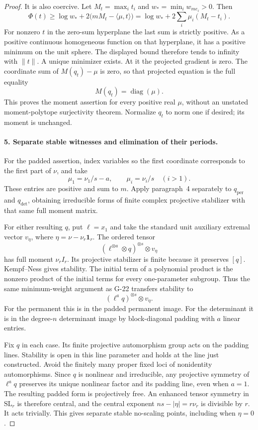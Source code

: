 \begin{proof}
It is also coercive. Let $M_t=\max_i t_i$ and
$w_* =\min_i w_{m e_i}>0$. Then
\[
 \Phi(t)\geq\log w_*+2\bigl(mM_t-\langle\mu,t\rangle\bigr)
       =\log w_*+2\sum_i\mu_i(M_t-t_i).
\]
For nonzero $t$ in the zero-sum hyperplane the last sum is
strictly positive. As a positive continuous homogeneous
function on that hyperplane, it has a positive minimum on
the unit sphere. The displayed bound therefore tends to
infinity with $\|t\|$. A unique minimizer exists.
At it the projected gradient is zero. The coordinate sum
of $M(q_t)-\mu$ is zero, so that projected equation is the
full equality
\begin{equation}\label{R34:prescribed}
                           M(q_t)=\operatorname{diag}(\mu).
\end{equation}
This proves the moment assertion for every positive real
$\mu$, without an unstated moment-polytope surjectivity theorem.
Normalize $q_t$ to norm one if desired; its moment is unchanged.

\paragraph{5. Separate stable witnesses and elimination of their periods.}
For the padded assertion, index variables so the first
coordinate corresponds to the first part of $\nu$, and take
\[
 \mu_1=\nu_1/s-a,\qquad \mu_i=\nu_i/s\quad(i>1).
\]
These entries are positive and sum to $m$. Apply paragraph~4
separately to $q_{\mathrm{per}}$ and $q_{\det}$, obtaining
irreducible forms of finite complex projective stabilizer
with that same full moment matrix.

For either resulting $q$, put $\ell=x_1$ and take the standard
unit auxiliary extremal vector $v_\eta$, where
$\eta=\nu-\nu_r\mathbf1_r$. The ordered tensor
\[
          (\ell^{\otimes a}\otimes q)^{\otimes s}\otimes v_\eta
\]
has full moment $\nu_r I_r$. Its projective stabilizer is
finite because it preserves $[q]$. Kempf--Ness gives stability.
The initial term of a polynomial product is the nonzero
product of the initial terms for every one-parameter subgroup.
Thus the same minimum-weight argument as G-22 transfers
stability to
\[
                      (\ell^a q)^{\otimes s}\otimes v_\eta.
\]
For the permanent this is in the padded permanent image.
For the determinant it is in the degree-$n$ determinant
image by block-diagonal padding with $a$ linear entries.

Fix $q$ in each case. Its finite projective automorphism
group acts on the padding lines. Stability is open in this
line parameter and holds at the line just constructed.
Avoid the finitely many proper fixed loci of nonidentity
automorphisms. Since $q$ is nonlinear and irreducible,
any projective symmetry of $\ell^a q$ preserves its unique
nonlinear factor and its padding line, even when $a=1$.
The resulting padded form is projectively free. An enhanced
tensor symmetry in $\mathrm{SL}_r$ is therefore central,
and the central exponent $ns-|\eta|=r\nu_r$ is divisible
by $r$. It acts trivially. This gives separate stable
no-scaling points, including when $\eta=0$.


\end{proof}
